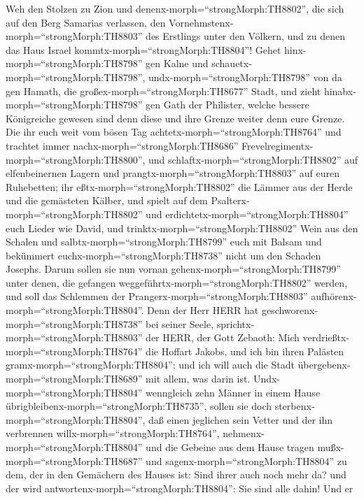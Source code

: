  Weh den Stolzen zu Zion und
denenx-morph=``strongMorph:TH8802'', die sich auf den Berg Samarias
verlassen, den Vornehmstenx-morph=``strongMorph:TH8803'' des Erstlings
unter den Völkern, und zu denen das Haus Israel
kommtx-morph=``strongMorph:TH8804''!  Gehet
hinx-morph=``strongMorph:TH8798'' gen Kalne und
schauetx-morph=``strongMorph:TH8798'', undx-morph=``strongMorph:TH8798''
von da gen Hamath, die großex-morph=``strongMorph:TH8677'' Stadt, und
zieht hinabx-morph=``strongMorph:TH8798'' gen Gath der Philister, welche
bessere Königreiche gewesen sind denn diese und ihre Grenze weiter denn
eure Grenze.  Die ihr euch weit vom bösen Tag
achtetx-morph=``strongMorph:TH8764'' und trachtet immer
nachx-morph=``strongMorph:TH8686''
Frevelregimentx-morph=``strongMorph:TH8800'',  und
schlaftx-morph=``strongMorph:TH8802'' auf elfenbeinernen Lagern und
prangtx-morph=``strongMorph:TH8803'' auf euren Ruhebetten; ihr
eßtx-morph=``strongMorph:TH8802'' die Lämmer aus der Herde und die
gemästeten Kälber,  und spielt auf dem
Psalterx-morph=``strongMorph:TH8802'' und
erdichtetx-morph=``strongMorph:TH8804'' euch Lieder wie David,
 und trinktx-morph=``strongMorph:TH8802'' Wein aus den
Schalen und salbtx-morph=``strongMorph:TH8799'' euch mit Balsam und
bekümmert euchx-morph=``strongMorph:TH8738'' nicht um den Schaden
Josephs.  Darum sollen sie nun vornan
gehenx-morph=``strongMorph:TH8799'' unter denen, die gefangen
weggeführtx-morph=``strongMorph:TH8802'' werden, und soll das Schlemmen
der Prangerx-morph=``strongMorph:TH8803''
aufhörenx-morph=``strongMorph:TH8804''.  Denn der Herr HERR
hat geschworenx-morph=``strongMorph:TH8738'' bei seiner Seele,
sprichtx-morph=``strongMorph:TH8803'' der HERR, der Gott Zebaoth: Mich
verdrießtx-morph=``strongMorph:TH8764'' die Hoffart Jakobs, und ich bin
ihren Palästen gramx-morph=``strongMorph:TH8804''; und ich will auch die
Stadt übergebenx-morph=``strongMorph:TH8689'' mit allem, was darin ist.
 Undx-morph=``strongMorph:TH8804'' wenngleich zehn Männer in
einem Hause übrigbleibenx-morph=``strongMorph:TH8735'', sollen sie doch
sterbenx-morph=``strongMorph:TH8804'',  daß einen jeglichen
sein Vetter und der ihn verbrennen willx-morph=``strongMorph:TH8764'',
nehmenx-morph=``strongMorph:TH8804'' und die Gebeine aus dem Hause
tragen mußx-morph=``strongMorph:TH8687'' und
sagenx-morph=``strongMorph:TH8804'' zu dem, der in den Gemächern des
Hauses ist: Sind ihrer auch noch mehr da? und der wird
antwortenx-morph=``strongMorph:TH8804'': Sie sind alle dahin! Und er
